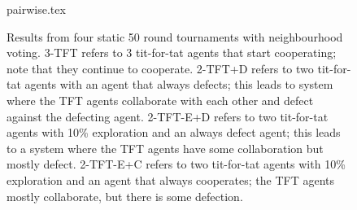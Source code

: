 \begin{figure}
\begin{center}
 {pairwise.tex} 
\end {center}
\caption{Results from four static 50 round tournaments with
  neighbourhood voting.  3-TFT refers to 3 tit-for-tat agents that
  start cooperating; note that they continue to cooperate.  2-TFT+D
  refers to two tit-for-tat agents with an agent that always defects;
  this leads to system where the TFT agents collaborate with each
  other and defect against the defecting agent.  2-TFT-E+D refers to
  two tit-for-tat agents with 10\% exploration and an always defect
  agent; this leads to a system where the TFT agents have some
  collaboration but mostly defect.  2-TFT-E+C refers to two
  tit-for-tat agents with 10\% exploration and an agent that always
  cooperates; the TFT agents mostly collaborate, but there is some
  defection. }
  \label{figStaticTwoVotes}
\end {figure}
